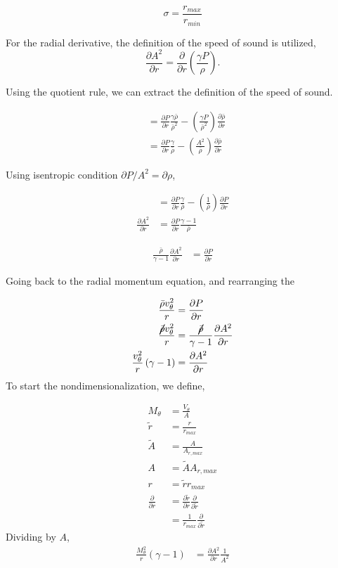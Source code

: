 \documentclass[12pt]{article}
\begin{document}
\[\sigma = \frac{r_{max}}{r_{min}}\]

For the radial derivative, the definition of the speed of sound is utilized,
\[\frac{\partial A^2}{\partial r } =
\frac{\partial}{\partial r} \left( \frac{\gamma P}{\rho} \right).\]

Using the quotient rule, we can extract the definition of the speed of sound.

\begin{align*}
&= \frac{\partial P}{\partial r} \frac{\gamma \bar{\rho}}{\bar{\rho}^2} -
\left(
    \frac{\gamma P}{\bar{\rho}^2} 
\right) 
\frac{\partial \bar{\rho}}{\partial r}\\
&=  \frac{\partial P}{\partial r} \frac{\gamma }{\bar{\rho}} -
\left( \frac{A^2}{\bar{\rho}} \right) 
\frac{\partial \bar{\rho} }{\partial r}
\end{align*}

Using isentropic condition $ \partial P/A^2 = \partial \rho$, 

\begin{align*}
&= \frac{\partial P}{\partial r} \frac{\gamma }{\bar{\rho}} -
\left( \frac{1}{\bar{\rho}} \right) \frac{\partial  P }{\partial r}\\
\frac{\partial A^2}{\partial r} 
&= \frac{\partial P}{\partial r} \frac{\gamma - 1}{\bar{\rho}}  
\end{align*}

\begin{align*}
    \frac{\bar{\rho}}{\gamma -1}\frac{\partial A^2}{\partial r} &= \frac{\partial P}{\partial r} 
\end{align*}


Going back to the radial momentum equation, and rearranging the 

\begin{align*}
    \frac{\bar{\rho} v_{\theta}^2}{r} 
&=\frac{\partial P}{\partial r}\\
\frac{\cancel{
        \bar{\rho}
} v_{\theta}^2}{r} 
&=\frac{\cancel{\bar{\rho}}}{\gamma -1}\frac{\partial A^2}{\partial r}\\
    \frac{v_{\theta}^2}{r}\left(\gamma -1\right) &= \frac{\partial A^2}{\partial r}
\end{align*}
To start the nondimensionalization, we define,

\begin{align*}
    M_{\theta} &= \frac{V_{\theta}}{A} \\ 
    \widetilde{r} &= \frac{r}{r_{max}}  \\
    \widetilde{A} &= \frac{A}{A_{r,max}}  \\
    A &= \widetilde{A}{A_{r,max}} \\
    r &= \widetilde{r}{r_{max}}\\
    \frac{\partial}{\partial r} &=
    \frac{\partial \widetilde{r}}{\partial r} \frac{\partial}{\partial \widetilde{r}}\\
                                &= \frac{1}{r_{max}}\frac{\partial}{\partial \widetilde{r}}
\end{align*}
Dividing by $A$,
\begin{align*}
    \frac{M_{\theta}^2}{r}\left(\gamma - 1\right) 
&= \frac{\partial A^2}{\partial r} \frac{1}{A^2}
\end{align*}
\end{document}
